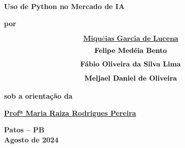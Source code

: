\begin{center}

\begin{singlespace}
{\large{\textbf{}}}

{\large{\textbf{}}}

{\large{\textbf{}}}

{\large{\textbf{}}}
\end{singlespace}

\vspace{4.0cm}

\textbf{\huge{{ Uso de Python no Mercado de IA }}}

\vspace{1cm}

\textbf{por}

\vspace {1.0cm}

\href{ }
{\large{$$\textbf { Miquéias Garcia de Lucena }$$$$\newline\textbf {Felipe Medéia Bento}$$$$\newline\textbf {Fábio Oliveira da Silva Lima}$$$$\newline\textbf {Meljael Daniel de Oliveira}$$}}

\vspace{1cm}

\textbf{sob a orientação da}

\vspace{1cm}

\href{ }
{\centering \large{\textbf{ Profª Maria Raiza Rodrigues Pereira }}}

\vspace{3.5cm}

\begin{singlespace}

\large{\textbf{Patos -- PB}}\\
\large{\textbf{Agosto de 2024}}

\end{singlespace}

\end{center}

\pagebreak

\thispagestyle{empty}

\vspace{1.5cm}

\thispagestyle{empty}

\mbox{}

\vspace{15cm}



